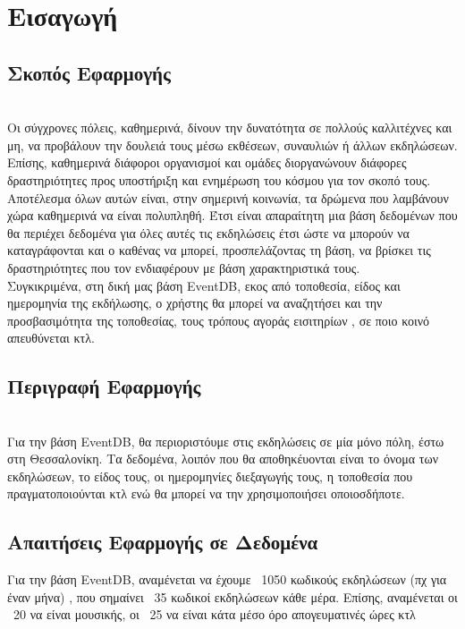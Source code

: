 \section{Εισαγωγή}

\subsection{Σκοπός Εφαρμογής}

\\ Οι σύγχρονες πόλεις, καθημερινά, δίνουν την δυνατότητα σε πολλούς καλλιτέχνες και μη,
να προβάλουν την δουλειά τους μέσω εκθέσεων, συναυλιών ή άλλων εκδηλώσεων. Επίσης, καθημερινά διάφοροι οργανισμοί και ομάδες διοργανώνουν διάφορες δραστηριότητες προς υποστήριξη και ενημέρωση του κόσμου για τον σκοπό τους. 
\\ Αποτέλεσμα όλων αυτών είναι, στην σημερινή κοινωνία, τα δρώμενα που λαμβάνουν χώρα καθημερινά να είναι πολυπληθή. Έτσι είναι απαραίτητη μια βάση δεδομένων που θα περιέχει δεδομένα για όλες αυτές τις εκδηλώσεις έτσι ώστε να μπορούν να καταγράφονται και ο καθένας να μπορεί, προσπελάζοντας τη βάση, να βρίσκει τις δραστηριότητες που τον ενδιαφέρουν με βάση χαρακτηριστικά τους.
\\ Συγκικριμένα, στη δική μας βάση EventDB, εκος από τοποθεσία, είδος και ημερομηνία της εκδήλωσης, ο χρήστης θα μπορεί να αναζητήσει και την προσβασιμότητα της τοποθεσίας, τους τρόπους αγοράς εισιτηρίων , σε ποιο κοινό απευθύνεται κτλ. 

\subsection{Περιγραφή Εφαρμογής}

\\Για την βάση EventDB, θα περιοριστόυμε στις εκδηλώσεις σε μία μόνο πόλη, έστω στη Θεσσαλονίκη. Τα δεδομένα, λοιπόν που θα αποθηκέυονται είναι το όνομα των εκδηλώσεων, το είδος τους,  οι ημερομηνίες διεξαγωγής τους, η τοποθεσία που πραγματοποιούνται κτλ ενώ θα μπορεί να την χρησιμοποιήσει οποιοσδήποτε.

\subsection{Απαιτήσεις Εφαρμογής σε Δεδομένα}

\] Για την βάση EventDB, αναμένεται να έχουμε ~1050 κωδικούς εκδηλώσεων (πχ για έναν μήνα) , που σημαίνει ~35 κωδικοί εκδηλώσεων κάθε μέρα. Επίσης, αναμένεται οι ~20 να είναι μουσικής, οι ~25 να είναι κάτα μέσο όρο απογευματινές ώρες κτλ



